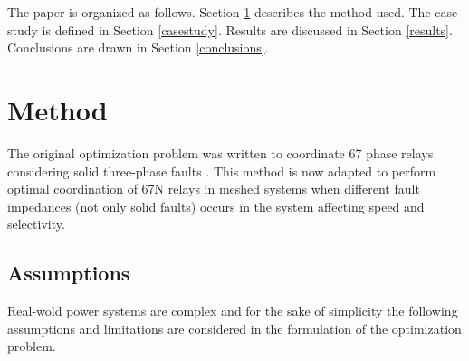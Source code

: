 \documentclass[letterpaper, 10 pt, conference]{IEEEtran}
\begin{document}
The paper is organized as follows. Section \ref{theoptmodel} describes the method used. The case-study is defined in Section \ref{casestudy}. Results are discussed in Section \ref{results}. Conclusions are drawn in Section \ref{conclusions}.


\section{Method} \label{theoptmodel}



The original optimization problem was written to coordinate  67 phase relays considering solid three-phase faults \cite{urdaneta1988}. This method is now adapted to perform optimal coordination of 67N relays in meshed systems when different fault impedances (not only solid faults) occurs in the system affecting speed and selectivity.

\subsection{Assumptions}

Real-wold power systems are complex and for the sake of simplicity the following assumptions and limitations are considered in the formulation of the optimization problem.
\end{document}
